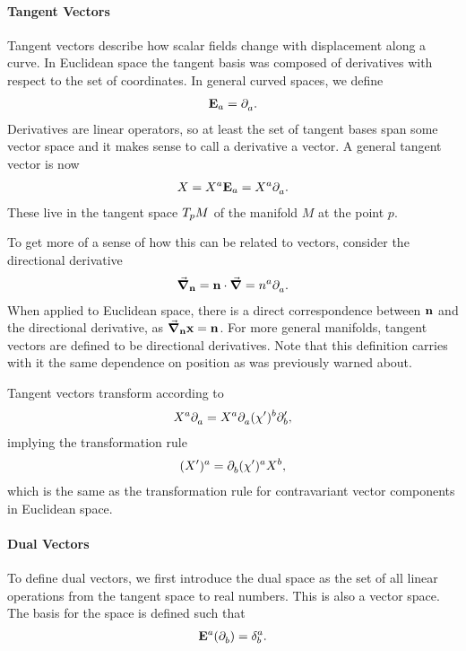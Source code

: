 \paragraph{Tangent Vectors}
Tangent vectors describe how scalar fields change with displacement along a curve. In Euclidean space the tangent basis was composed of derivatives with respect to the set of coordinates. In general curved spaces, we define
\begin{align*}
	\tb{a} = \del{a}{}.
\end{align*}
Derivatives are linear operators, so at least the set of tangent bases span some vector space and it makes sense to call a derivative a vector. A general tangent vector is now
\begin{align*}
	X = X^{a}\tb{a} = X^{a}\del{a}{}.
\end{align*}
These live in the tangent space $\ts{p}{M}$ of the manifold $M$ at the point $p$.

To get more of a sense of how this can be related to vectors, consider the directional derivative
\begin{align*}
	\grad_{\vb{n}} = \vb{n}\cdot\grad = n^{a}\del{a}{}.
\end{align*}
When applied to Euclidean space, there is a direct correspondence between $\vb{n}$ and the directional derivative, as $\grad_{\vb{n}}{\vb{x}} = \vb{n}$. For more general manifolds, tangent vectors are defined to be directional derivatives. Note that this definition carries with it the same dependence on position as was previously warned about.

Tangent vectors transform according to
\begin{align*}
	X^{a}\del{a}{} = X^{a}\del{a}{(\chi^{\prime})^{b}}\del[\prime]{b}{},
\end{align*}
implying the transformation rule
\begin{align*}
	(X^{\prime})^{a} = \del{b}{(\chi^{\prime})^{a}}X^{b},
\end{align*}
which is the same as the transformation rule for contravariant vector components in Euclidean space.

\paragraph{Dual Vectors}
To define dual vectors, we first introduce the dual space as the set of all linear operations from the tangent space to real numbers. This is also a vector space. The basis for the space is defined such that
\begin{align*}
	\db{a}(\del{b}{}) = \kdelta{b}{a}.
\end{align*}

